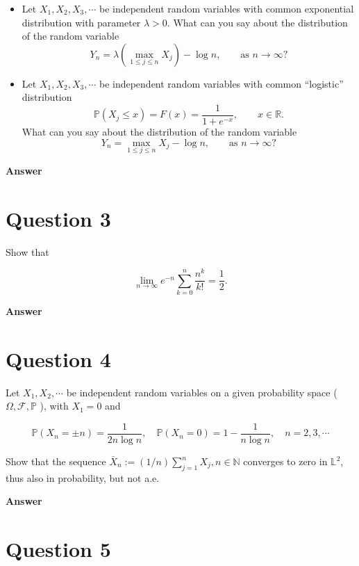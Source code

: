 \documentclass[letterpaper]{article}
\begin{document}
		\begin{itemize}
			\item[(i)] Let $X_1,X_2,X_3,\cdots$ be independent random variables with common exponential distribution with parameter $\lambda>0$. What can you say about the distribution of the random variable
			\[
			Y_n=\lambda\left(\max_{1\le j\le n} X_j\right)-\log n,
			\qquad \text{as } n\to\infty?
			\]
			
			\item[(ii)] Let $X_1,X_2,X_3,\cdots$ be independent random variables with common ``logistic'' distribution
			\[
			\mathbb{P}(X_j\le x)=F(x)=\frac{1}{1+e^{-x}},\qquad x\in\mathbb{R}.
			\]
			What can you say about the distribution of the random variable
			\[
			Y_n=\max_{1\le j\le n} X_j-\log n,
			\qquad \text{as } n\to\infty?
			\]
		\end{itemize}
	
		\textbf{Answer}
		
		\clearpage
		
		\section{Question 3}
		
		Show that
		
		$$
		\lim _{n \rightarrow \infty} e^{-n} \sum_{k=0}^{n} \frac{n^{k}}{k!}=\frac{1}{2} .
		$$
		
		
		\textbf{Answer}
		
		\clearpage
		
		\section{Question 4}
		
		Let $X_{1}, X_{2}, \cdots$ be independent random variables on a given probability space ( $\Omega, \mathcal{F}, \mathbb{P}$ ), with $X_{1}=0$ and
		
		$$
		\mathbb{P}\left(X_{n}= \pm n\right)=\frac{1}{2 n \log n}, \quad \mathbb{P}\left(X_{n}=0\right)=1-\frac{1}{n \log n}, \quad n=2,3, \cdots
		$$
		
		Show that the sequence $\bar{X}_{n}:=(1 / n) \sum_{j=1}^{n} X_{j}, n \in \mathbb{N}$ converges to zero in $\mathbb{L}^{2}$, thus also in probability, but not a.e.
		
		
		\textbf{Answer}
		
		\clearpage
		
		\section{Question 5}
		
\end{document}
